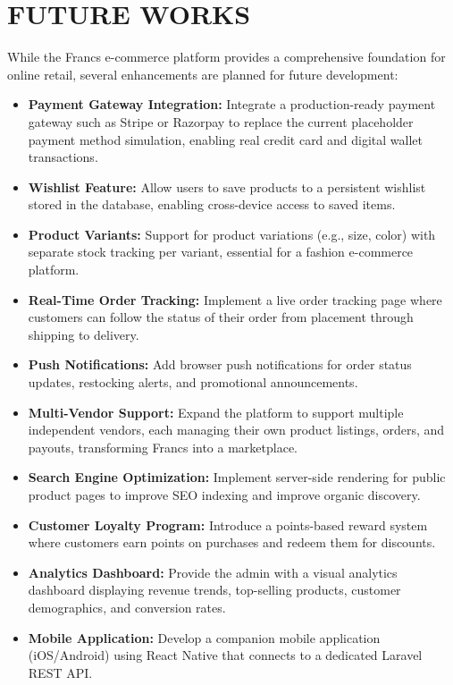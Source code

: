 \chapter{FUTURE WORKS}

While the Francs e-commerce platform provides a comprehensive foundation for online retail, several enhancements are planned for future development:

\begin{itemize}
    \item \textbf{Payment Gateway Integration:} Integrate a production-ready payment gateway such as Stripe or Razorpay to replace the current placeholder payment method simulation, enabling real credit card and digital wallet transactions.

    \item \textbf{Wishlist Feature:} Allow users to save products to a persistent wishlist stored in the database, enabling cross-device access to saved items.

    \item \textbf{Product Variants:} Support for product variations (e.g., size, color) with separate stock tracking per variant, essential for a fashion e-commerce platform.

    \item \textbf{Real-Time Order Tracking:} Implement a live order tracking page where customers can follow the status of their order from placement through shipping to delivery.

    \item \textbf{Push Notifications:} Add browser push notifications for order status updates, restocking alerts, and promotional announcements.

    \item \textbf{Multi-Vendor Support:} Expand the platform to support multiple independent vendors, each managing their own product listings, orders, and payouts, transforming Francs into a marketplace.

    \item \textbf{Search Engine Optimization:} Implement server-side rendering for public product pages to improve SEO indexing and improve organic discovery.

    \item \textbf{Customer Loyalty Program:} Introduce a points-based reward system where customers earn points on purchases and redeem them for discounts.

    \item \textbf{Analytics Dashboard:} Provide the admin with a visual analytics dashboard displaying revenue trends, top-selling products, customer demographics, and conversion rates.

    \item \textbf{Mobile Application:} Develop a companion mobile application (iOS/Android) using React Native that connects to a dedicated Laravel REST API.
\end{itemize}

